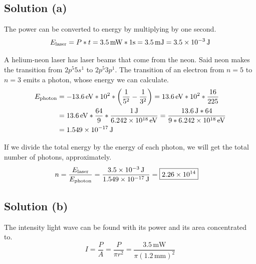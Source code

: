 \documentclass[12pt]{article}
\newcommand{\E}[1]{\times 10^{#1}}
\begin{document}
        \subsection{Solution (a)}
            The power can be converted to energy by multiplying by one second.
            \begin{equation}
                E_{\rm laser}   =   P * t 
                    =   3.5\,\unit{\milli\watt} * 1 \unit{\second}
                    =   3.5\,\unit{\milli\joule}
                    =   3.5\E{-3}\,\unit{\joule}
            \end{equation}

            A helium-neon laser has laser beams that come from the neon. 
            Said neon makes the transition from $2p^5 5s^1$ to $2p^5 3p^1$.
            The transition of an electron from $n = 5$ to $n = 3$ emits a photon, whose energy we can calculate.
            \begin{align}
                E_{\rm photon}  &=  -13.6\,\unit{\eV} * 10^2 * \left( \frac{1}{5^2} - \frac{1}{3^2} \right)
                    =   13.6\,\unit{\eV} * 10^2 * \frac{16}{225}\\
                    &=  13.6\,\unit{\eV} * \frac{64}{9} * \frac{1\,\unit{\joule}}{6.242\E{18}\,\unit{\eV}}
                    =   \frac{13.6\,\unit{\joule} * 64}{9 * 6.242\E{18}\,\unit{\eV}}\\
                    &=  1.549\E{-17}\,\unit{\joule}
            \end{align}

            If we divide the total energy by the energy of each photon, we will get the total number of photons, approximately. 
            \begin{align}
                n   &=  \frac{E_{\rm laser}}{E_{\rm photon}}
                    =   \frac{3.5\E{-3}\,\unit{\joule}}{1.549\E{-17}\,\unit{\joule}}
                    =   \boxed{2.26\E{14}}
            \end{align}

        \subsection{Solution (b)}
            The intensity light wave can be found with its power and its area concentrated to.
            \begin{equation}
                I = \frac{P}{A} = \frac{P}{\pi r^2} = \frac{3.5\,\unit{\milli\watt}}{\pi (1.2\,\unit{\milli\meter})^2}
            \end{equation}
\end{document}
